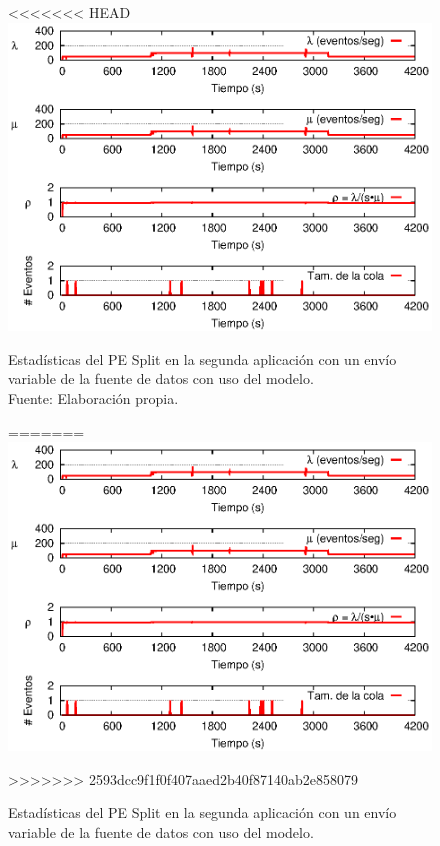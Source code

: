 \begin{figure}[!ht]
<<<<<<< HEAD
    \centering
    \captionsetup{justification=centering}
    \includegraphics[scale=1]{images/exp/app2/normal/cm/statusSplitPE.eps}
    \caption[Estadísticas del PE Split en la segunda aplicación con un envío variable de la fuente de datos con uso del modelo.]{Estadísticas del PE Split en la segunda aplicación con un envío variable de la fuente de datos con uso del modelo.\\Fuente: Elaboración propia.}
=======
\centering
    \includegraphics[scale=1.1]{images/exp/app2/normal/cm/statusSplitPE.eps}
    \caption{Estad\'isticas del PE Split en la segunda aplicaci\'on con un env\'io variable de la fuente de datos con uso del modelo.}
>>>>>>> 2593dcc9f1f0f407aaed2b40f87140ab2e858079
    \label{fig:app2-normal-statusSplitPE-cm}
\end{figure}

